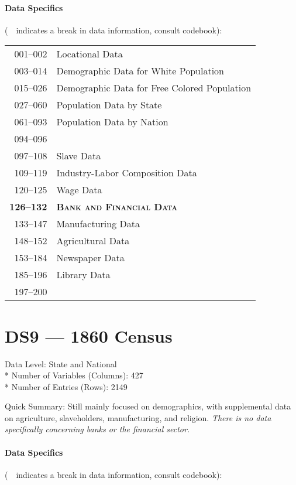 ﻿\documentclass[12pt]{report}
\begin{document}
	\paragraph{Data Specifics} (\guillemotleft~\guillemotright~indicates a break in data information, consult codebook):
	\vspace{1em}
	
	\begin{tabular}{r|l}
		001--002 & Locational Data\\
		003--014 & Demographic Data for White Population\\
		015--026 & Demographic Data for Free Colored Population\\
		027--060 & Population Data by State\\
		061--093 & Population Data by Nation\\
		094--096 & \guillemotleft~\guillemotright\\
		097--108 & Slave Data\\
		109--119 & Industry-Labor Composition Data\\
		120--125 & Wage Data\\
		\textbf{126--132} & \textsc{\textbf{Bank and Financial Data}}\\
		133--147 & Manufacturing Data\\
		148--152 & Agricultural Data\\
		153--184 & Newspaper Data\\
		185--196 & Library Data\\
		197--200 & \guillemotleft~\guillemotright\\
	\end{tabular}
	\newpage

\section{DS9 --- 1860 Census}
	Data Level: State and National\\*
	Number of Variables (Columns): 427\\*
	Number of Entries (Rows): 2149
	\vspace{1.5em}
	
	\noindent Quick Summary: Still mainly focused on demographics, with supplemental data on agriculture, slaveholders, manufacturing, and religion. \textit{There is no data specifically concerning banks or the financial sector.}
	
	\paragraph{Data Specifics} (\guillemotleft~\guillemotright~indicates a break in data information, consult codebook):
	\vspace{1em}
	
\end{document}
